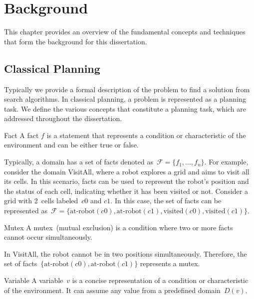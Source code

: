 \chapter{Background}
\label{sec:background}

This chapter provides an overview of the fundamental concepts and techniques that form the background for this dissertation.

\section{Classical Planning}
\label{sec:classical-planning}

Typically we provide a formal description of the problem to find a solution from search algorithms. In classical planning, a problem is represented as a planning task. We define the various concepts that constitute a planning task, which are addressed throughout the dissertation.

\begin{definition}{Fact}
    \label{def:fact}
    A fact $f$ is a statement that represents a condition or characteristic of the environment and can be either true or false.
\end{definition}

Typically, a domain has a set of facts denoted as~$\mathcal{F} = \{f_1, \ldots, f_n\}$. For example, consider the domain VisitAll, where a robot explores a grid and aims to visit all its cells. In this scenario, facts can be used to represent the robot's position and the status of each cell, indicating whether it has been visited or not. Consider a grid with 2~cells labeled~$c0$ and $c1$. In this case, the set of facts can be represented as~$\mathcal{F} = \{\text{at-robot}(c0),\text{at-robot}(c1),\text{visited}(c0),\text{visited}(c1)\}$.

\begin{definition}{Mutex}
    \label{def:mutex}
    A mutex~(mutual exclusion) is a condition where two or more facts cannot occur simultaneously.
\end{definition}

In VisitAll, the robot cannot be in two positions simultaneously. Therefore, the set of facts~$\{\text{at-robot}(c0),\text{at-robot}(c1)\}$ represents a mutex.

\begin{definition}{Variable}
    \label{def:variable}
    A variable~$v$ is a concise representation of a condition or characteristic of the environment. It can assume any value from a predefined domain~$D(v)$.
\end{definition}

